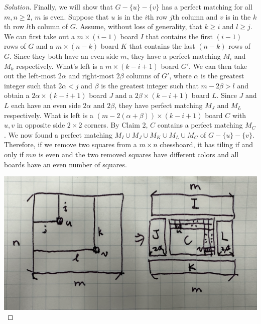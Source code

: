 \documentclass{article}
\begin{document}
\begin{enumerate}[label=(\alph*)]
\begin{proof}[Solution]
        Finally, we will show that $G - \{u\} - \{v\}$ has a perfect matching for all $m, n \geq 2$, $m$ is even. Suppose that $u$ is in the $i$th row $j$th column and $v$ is in the $k$th row $l$th column of $G$. Assume, without loss of generality, that $k \geq i$ and $l \geq j$. We can first take out a $m \times (i - 1)$ board $I$ that contains the first $(i - 1)$ rows of $G$ and a $m \times (n - k)$ board $K$ that contains the last $(n - k)$ rows of $G$. Since they both have an even side $m$, they have a perfect matching $M_i$ and $M_k$ respectively. What's left is a $m \times (k - i + 1)$ board $G'$. We can then take out the left-most $2\alpha$ and right-most $2\beta$ columns of $G'$, where $\alpha$ is the greatest integer such that $2\alpha < j$ and $\beta$ is the greatest integer such that $m - 2\beta > l$ and obtain a $2\alpha \times (k - i + 1)$ board $J$ and a $2\beta \times (k - i + 1)$ board $L$. Since $J$ and $L$ each have an even side $2\alpha$ and $2\beta$, they have
        perfect matching $M_J$ and $M_L$ respectively. What is left is a $(m - 2(\alpha + \beta)) \times (k - i + 1)$ board $C$ with $u, v$ in opposite side $2 \times 2$ corners. By Claim 2, $C$ contains a perfect matching $M_C$. We now found a perfect matching $M_I \cup M_J \cup M_K \cup M_L \cup M_C$ of $G - \{u\} - \{v\}$. Therefore, if we remove two squares from a $m \times n$ chessboard, it has tiling if and only if $mn$ is even and the two removed squares have different colors and all boards have an even number of squares.
        
        \includegraphics[width=\textwidth]{Q382b3}
    \end{proof}
\end{enumerate}

\newpage
\end{document}
